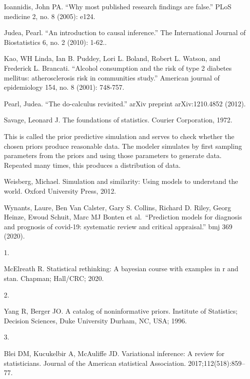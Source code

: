 \documentclass[
  10pt,
]{scrbook}
\newlength{\cslhangindent}
\newlength{\csllabelwidth}
\newlength{\cslentryspacingunit} %
\newenvironment{CSLReferences}[2] %
 {%
  \setlength{\parindent}{0pt}
  \ifodd #1
  \let\oldpar\par
  \def\par{\hangindent=\cslhangindent\oldpar}
  \fi
  \setlength{\parskip}{#2\cslentryspacingunit}
 }%
 {}
\newcommand{\CSLLeftMargin}[1]{\parbox[t]{\csllabelwidth}{#1}}
\newcommand{\CSLRightInline}[1]{\parbox[t]{\linewidth - \csllabelwidth}{#1}\break}
\begin{document}
Ioannidis, John PA. ``Why most published research findings are false.'' PLoS medicine 2, no. 8 (2005): e124.

Judea, Pearl. ``An introduction to causal inference.'' The International Journal of Biostatistics 6, no. 2 (2010): 1-62..

Kao, WH Linda, Ian B. Puddey, Lori L. Boland, Robert L. Watson, and Frederick L. Brancati. ``Alcohol consumption and the risk of type 2 diabetes mellitus: atherosclerosis risk in communities study.'' American journal of epidemiology 154, no. 8 (2001): 748-757.

Pearl, Judea. ``The do-calculus revisited.'' arXiv preprint arXiv:1210.4852 (2012).

Savage, Leonard J. The foundations of statistics. Courier Corporation, 1972.

This is called the prior predictive simulation and serves to check whether the chosen priors produce reasonable data. The modeler simulates by first sampling parameters from the priors and using those parameters to generate data. Repeated many times, this produces a distribution of data.

Weisberg, Michael. Simulation and similarity: Using models to understand the world. Oxford University Press, 2012.

Wynants, Laure, Ben Van Calster, Gary S. Collins, Richard D. Riley, Georg Heinze, Ewoud Schuit, Marc MJ Bonten et al.~``Prediction models for diagnosis and prognosis of covid-19: systematic review and critical appraisal.'' bmj 369 (2020).

\hypertarget{refs}{}
\begin{CSLReferences}{0}{0}
\leavevmode{}%
\CSLLeftMargin{1. }
\CSLRightInline{McElreath R. Statistical rethinking: A bayesian course with examples in r and stan. Chapman; Hall/CRC; 2020. }

\leavevmode{}%
\CSLLeftMargin{2. }
\CSLRightInline{Yang R, Berger JO. A catalog of noninformative priors. Institute of Statistics; Decision Sciences, Duke University Durham, NC, USA; 1996. }

\leavevmode{}%
\CSLLeftMargin{3. }
\CSLRightInline{Blei DM, Kucukelbir A, McAuliffe JD. Variational inference: A review for statisticians. Journal of the American statistical Association. 2017;112(518):859--77. }

\end{CSLReferences}

\printindex
\thispagestyle{empty}
\end{document}

